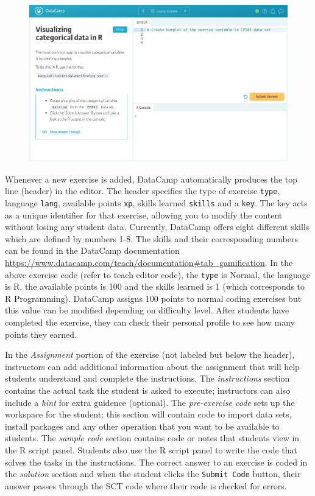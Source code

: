 \documentclass[12pt]{article}
\begin{document}
\begin{figure}[h]
  \includegraphics[scale = 0.19] {preview.jpg}
\end{figure}


Whenever a new exercise is added, DataCamp automatically produces the top line (header) in the editor. The header specifies the type
of exercise \texttt{type}, language \texttt{lang}, available points \texttt{xp}, skills learned \texttt{skills} and a \texttt{key}. The key acts as a unique
identifier for that exercise, allowing you to modify the content without losing any student data. Currently, DataCamp offers
eight different skills which are defined by numbers 1-8. The skills and their corresponding numbers can be found in the DataCamp
documentation \url{https://www.datacamp.com/teach/documentation#tab_gamification}. 
In the above exercise code (refer to teach editor code), the \texttt{type} is Normal, the language is R, the available points is 100 and the skills learned is 1 (which 
corresponds to R Programming). DataCamp assigns 100 points to normal coding exercises but this value can be modified depending on
difficulty level. After students have completed the exercise, they can check their personal profile to see how many points they earned.


In the \textit{Assignment} portion of the exercise (not labeled but below the header), instructors can add additional information about the assignment that will help
students understand and complete the instructions. The \textit{instructions} section contains the actual task the student is
asked to execute; instructors can also include a \textit{hint} for extra guidence (optional). The \textit{pre-exercise code} sets up the workspace for 
the student; this section will contain code to import data sets, install packages and any other operation that you want to be available to
students. The \textit{sample code} section contains code or notes that students view in the R script panel. Students also use the R script panel to write
the code that solves the tasks in the instructions. The correct answer to an exercise is coded in the \textit{solution} section
and when the student clicks the \texttt{Submit Code} button, their answer passes through the SCT code where their code is checked for errors.
\end{document}
